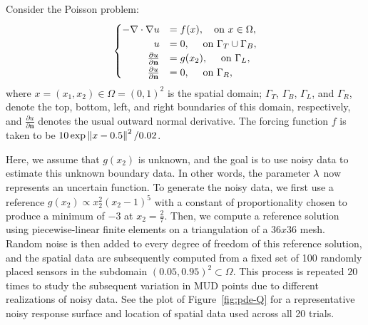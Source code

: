 Consider the Poisson problem:
\begin{equation}\label{eq:pde-equation}
\begin{cases}
\hfill -\nabla \cdot \nabla u &= f(x), \quad\text{on } x\in \Omega, \\
\hfill u &= 0, \quad\text{ on } \Gamma_T \cup \Gamma_B, \\
\hfill \frac{\partial u}{\partial \mathbf{n}} &= g(x_2), \quad\text{ on } \Gamma_L, \\
\hfill \frac{\partial u}{\partial \mathbf{n}} &= 0, \quad\text{ on } \Gamma_R,
\end{cases}
\end{equation}
where $x=(x_1, x_2) \in \Omega = (0,1)^2$ is the spatial domain; $\Gamma_T$, $\Gamma_B$, $\Gamma_L$, and $\Gamma_R$, denote the top, bottom, left, and right boundaries of this domain, respectively, and $\frac{\partial u}{\partial \mathbf{n}}$ denotes the usual outward normal derivative.
The forcing function $f$ is taken to be $10\exp{\left\Vert x - 0.5\right\Vert^2 / 0.02}$.

Here, we assume that $g(x_2)$ is unknown, and the goal is to use noisy data to estimate this unknown boundary data.
In other words, the parameter $\lambda$ now represents an uncertain function.
To generate the noisy data, we first use a reference $g(x_2)\propto x_2^2(x_2-1)^5$ with a constant of proportionality chosen to produce a minimum of $-3$ at $x_2=\frac{2}{7}$.
Then, we compute a reference solution using piecewise-linear finite elements on a triangulation of a $36x36$ mesh.
Random noise is then added to every degree of freedom of this reference solution, and the spatial data are subsequently computed from a fixed set of 100 randomly placed sensors in the subdomain $(0.05, 0.95)^2 \subset \Omega$.
This process is repeated $20$ times to study the subsequent variation in MUD points due to different realizations of noisy data.
See the plot of Figure~\ref{fig:pde-Q} for a representative noisy response surface and location of spatial data used across all 20 trials.

